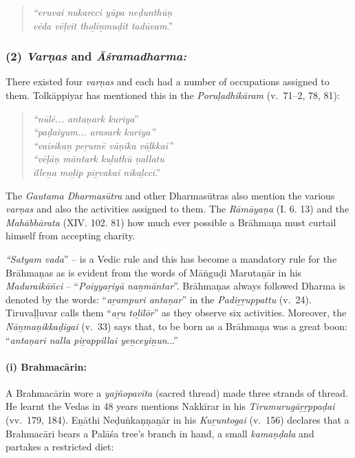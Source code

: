 \begin{quote}
\textit{“eruvai nukarcci yūpa neḍunthūṇ}\\\textit{vēda vēḷvit thoḻiṉmuḍit tadūvam}.”
\end{quote}


\subsubsection*{(2) \textit{Varṇas} and \textit{Āśramadharma:}}

\vskip -7pt

There existed four \textit{varṇas} and each had a number of occupations assigned to them. Tolkāppiyar has mentioned this in the \textit{Poruḷadhikāram} (v.~71–2, 78, 81):

\begin{quote}
\textit{“nūlē... antaṇark kuriya}”\\\textit{“paḍaiyum... arasark kuriya”}\\\textit{“vaisikaṉ peṟumē vāṇika vāḻkkai”}\\\textit{“vēḷāṇ māntark kuḻuthū ṇallatu}\\\textit{illeṉa moḻip piṟvakai nikaḻcci}.”
\end{quote}

The \textit{Gautama Dharmasūtra} and other Dharmasūtras also mention the various \textit{varṇas} and also the activities assigned to them. The \textit{Rāmāyaṇa} (I. 6. 13) and the \textit{Mahābhārata} (XIV. 102. 81) how much ever possible a Brāhmaṇa must curtail himself from accepting charity.

\textit{“Satyam vada}” – is a Vedic rule and this has become a mandatory rule for the Brāhmaṇas as is evident from the words of Māṅguḍi Marutaṉār in his \textit{Maduraikāñci} – “\textit{Poiyyaṟiyā naṉmāntar}”. Brāhmaṇas always followed Dharma is denoted by the words: “\textit{aṟampuri antaṇar}” in the \textit{Padiṟṟuppattu} (v.~24). Tiruvaḷḷuvar calls them “\textit{aṟu toḻilōr}” as they observe six activities. Moreover, the \textit{Nāṉmaṇikkaḍigai} (v.~33) says that, to be born as a Brāhmaṇa was a great boon: “\textit{antaṇari nalla piṟappillai yeṉceyiṉun}...”

\paragraph*{(i) Brahmacārin:}

\vskip -7pt

A Brahmacārin wore a \textit{yajñopavīta} (sacred thread) made three strands of thread. He learnt the Vedas in 48 years mentions Nakkīrar in his \textit{Tirumurugāṟṟppaḍai} (vv.~179, 184). Eṉāthi Neḍuṅkaṇṇaṉār in his \textit{Kuṟuntogai} (v.~156) declares that a Brahmacāri bears a Palāśa tree's branch in hand, a small \textit{kamaṇḍala} and partakes a restricted diet:

